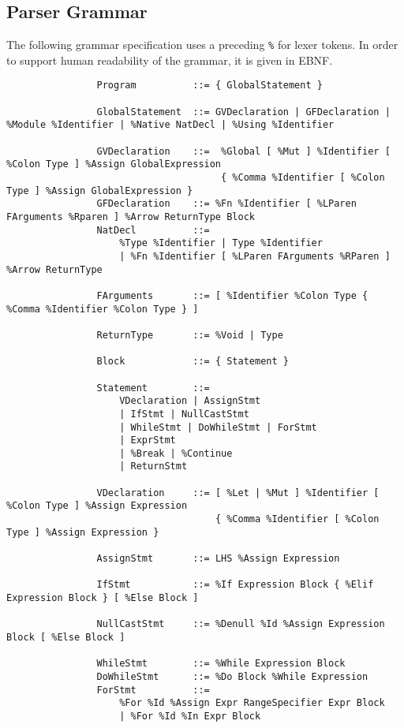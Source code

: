 \documentclass{article}
\begin{document}
		\subsection{Parser Grammar}
		
			The following grammar specification uses a preceding \texttt{\%} for lexer tokens. In order to support human readability of the grammar, it is given in EBNF.
		
			\begin{small}\begin{verbatim}
				Program          ::= { GlobalStatement }
				                 
				GlobalStatement  ::= GVDeclaration | GFDeclaration | %Module %Identifier | %Native NatDecl | %Using %Identifier
				                 
				GVDeclaration    ::=  %Global [ %Mut ] %Identifier [ %Colon Type ] %Assign GlobalExpression
				                      { %Comma %Identifier [ %Colon Type ] %Assign GlobalExpression }
				GFDeclaration    ::= %Fn %Identifier [ %LParen FArguments %Rparen ] %Arrow ReturnType Block
				NatDecl          ::=
				    %Type %Identifier | Type %Identifier
				    | %Fn %Identifier [ %LParen FArguments %RParen ] %Arrow ReturnType
				                 
				FArguments       ::= [ %Identifier %Colon Type { %Comma %Identifier %Colon Type } ]
				
				ReturnType       ::= %Void | Type
				                 
				Block            ::= { Statement }
				
				Statement        ::=
				    VDeclaration | AssignStmt
				    | IfStmt | NullCastStmt
				    | WhileStmt | DoWhileStmt | ForStmt
				    | ExprStmt
				    | %Break | %Continue
				    | ReturnStmt
				                 
				VDeclaration     ::= [ %Let | %Mut ] %Identifier [ %Colon Type ] %Assign Expression
				                     { %Comma %Identifier [ %Colon Type ] %Assign Expression }
				                 
				AssignStmt       ::= LHS %Assign Expression
				                 
				IfStmt           ::= %If Expression Block { %Elif Expression Block } [ %Else Block ]
				                 
				NullCastStmt     ::= %Denull %Id %Assign Expression Block [ %Else Block ]
				                 
				WhileStmt        ::= %While Expression Block
				DoWhileStmt      ::= %Do Block %While Expression
				ForStmt          ::=
				    %For %Id %Assign Expr RangeSpecifier Expr Block
				    | %For %Id %In Expr Block
				                 

\end{verbatim}
\end{small}
\end{document}
